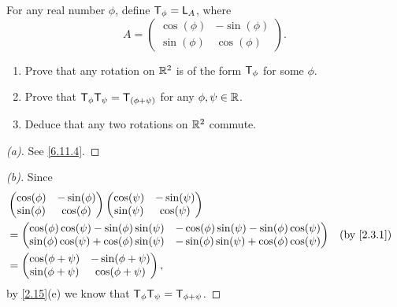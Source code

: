 \begin{ex}\label{ex:6.11.5}
  For any real number \(\phi\), define \(\mathsf{T}_{\phi} = \mathsf{L}_A\), where
  \[
    A = \begin{pmatrix}
      \cos(\phi) & -\sin(\phi) \\
      \sin(\phi) & \cos(\phi)
    \end{pmatrix}.
  \]
  \begin{enumerate}
    \item Prove that any rotation on \(\mathbb{R}^2\) is of the form \(\mathsf{T}_{\phi}\) for some \(\phi\).
    \item Prove that \(\mathsf{T}_{\phi} \mathsf{T}_{\psi} = \mathsf{T}_{(\phi + \psi)}\) for any \(\phi, \psi \in \mathbb{R}\).
    \item Deduce that any two rotations on \(\mathbb{R}^2\) commute.
  \end{enumerate}
\end{ex}

\begin{proof}[(a)]
  See \cref{6.11.4}.
\end{proof}

\begin{proof}[(b)]
  Since
  \begin{align*}
     & \begin{pmatrix}
         \cos(\phi) & -\sin(\phi) \\
         \sin(\phi) & \cos(\phi)
       \end{pmatrix} \begin{pmatrix}
                       \cos(\psi) & -\sin(\psi) \\
                       \sin(\psi) & \cos(\psi)
                     \end{pmatrix}                                                            \\
     & = \begin{pmatrix}
           \cos(\phi) \cos(\psi) - \sin(\phi) \sin(\psi) & - \cos(\phi) \sin(\psi) - \sin(\phi) \cos(\psi) \\
           \sin(\phi) \cos(\psi) + \cos(\phi) \sin(\psi) & - \sin(\phi) \sin(\psi) + \cos(\phi) \cos(\psi)
         \end{pmatrix} &  & \by{2.3.1} \\
     & = \begin{pmatrix}
           \cos(\phi + \psi) & -\sin(\phi + \psi) \\
           \sin(\phi + \psi) & \cos(\phi + \psi)
         \end{pmatrix},
  \end{align*}
  by \cref{2.15}(e) we know that \(\mathsf{T}_{\phi} \mathsf{T}_{\psi} = \mathsf{T}_{\phi + \psi}\).
\end{proof}

